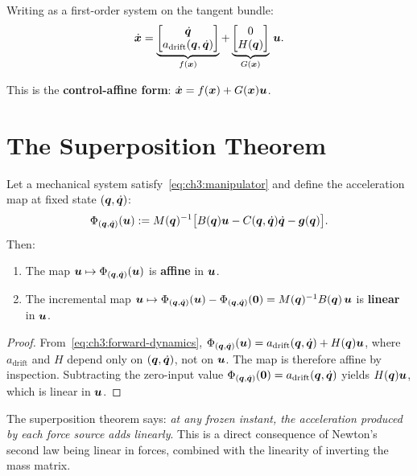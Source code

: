Writing as a first-order system on the tangent bundle:
\begin{equation}
\dot{\bm{x}} = \underbrace{
\begin{bmatrix} \dot{\bm{q}} \\ a_{\text{drift}}(\bm{q},\dot{\bm{q}}) \end{bmatrix}
}_{f(\bm{x})}
+ \underbrace{
\begin{bmatrix} 0 \\ H(\bm{q}) \end{bmatrix}
}_{G(\bm{x})}\,\bm{u}.
\label{eq:ch3:state-space}
\end{equation}

This is the \textbf{control-affine form}: $\dot{\bm{x}} = f(\bm{x}) + G(\bm{x})\bm{u}$.


\section{The Superposition Theorem}

\begin{theorem}
\label{thm:ch3:superposition}
Let a mechanical system satisfy~\eqref{eq:ch3:manipulator} and define the acceleration
map at fixed state $(\bm{q},\dot{\bm{q}})$:
\[
\Phi_{(\bm{q},\dot{\bm{q}})}(\bm{u})
:= M(\bm{q})^{-1}\bigl[B(\bm{q})\bm{u} - C(\bm{q},\dot{\bm{q}})\dot{\bm{q}} - \bm{g}(\bm{q})\bigr].
\]
Then:
\begin{enumerate}
\item The map $\bm{u} \mapsto \Phi_{(\bm{q},\dot{\bm{q}})}(\bm{u})$ is \textbf{affine} in $\bm{u}$.
\item The incremental map
$\bm{u} \mapsto \Phi_{(\bm{q},\dot{\bm{q}})}(\bm{u}) - \Phi_{(\bm{q},\dot{\bm{q}})}(\bm{0})
= M(\bm{q})^{-1}B(\bm{q})\,\bm{u}$
is \textbf{linear} in $\bm{u}$.
\end{enumerate}
\end{theorem}

\begin{proof}
From~\eqref{eq:ch3:forward-dynamics}, $\Phi_{(\bm{q},\dot{\bm{q}})}(\bm{u})
= a_{\text{drift}}(\bm{q},\dot{\bm{q}}) + H(\bm{q})\bm{u}$,
where $a_{\text{drift}}$ and $H$ depend only on $(\bm{q},\dot{\bm{q}})$, not on $\bm{u}$. The
map is therefore affine by inspection. Subtracting the zero-input value
$\Phi_{(\bm{q},\dot{\bm{q}})}(\bm{0}) = a_{\text{drift}}(\bm{q},\dot{\bm{q}})$
yields $H(\bm{q})\bm{u}$, which is linear in $\bm{u}$.
\end{proof}

\begin{intuitionbox}
The superposition theorem says: \emph{at any frozen instant, the acceleration produced
by each force source adds linearly}. This is a direct consequence of Newton's second law
being linear in forces, combined with the linearity of inverting the mass matrix.
\end{intuitionbox}

